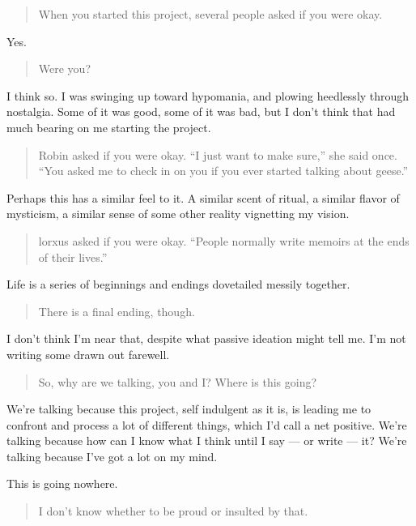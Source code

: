 \begin{quote}
When you started this project, several people asked if you were okay.
\end{quote}

Yes.

\begin{quote}
Were you?
\end{quote}

I think so. I was swinging up toward hypomania, and plowing heedlessly through nostalgia. Some of it was good, some of it was bad, but I don't think that had much bearing on me starting the project.

\begin{quote}
Robin asked if you were okay. ``I just want to make sure,'' she said once. ``You asked me to check in on you if you ever started talking about geese.''
\end{quote}

Perhaps this has a similar feel to it. A similar scent of ritual, a similar flavor of mysticism, a similar sense of some other reality vignetting my vision.

\begin{quote}
lorxus asked if you were okay. ``People normally write memoirs at the ends of their lives.''
\end{quote}

Life is a series of beginnings and endings dovetailed messily together.

\begin{quote}
There is a final ending, though.
\end{quote}

I don't think I'm near that, despite what passive ideation might tell me. I'm not writing some drawn out farewell.

\begin{quote}
So, why are we talking, you and I? Where is this going?
\end{quote}

We're talking because this project, self indulgent as it is, is leading me to confront and process a lot of different things, which I'd call a net positive. We're talking because how can I know what I think until I say --- or write --- it? We're talking because I've got a lot on my mind.

This is going nowhere.

\begin{quote}
I don't know whether to be proud or insulted by that.
\end{quote}

